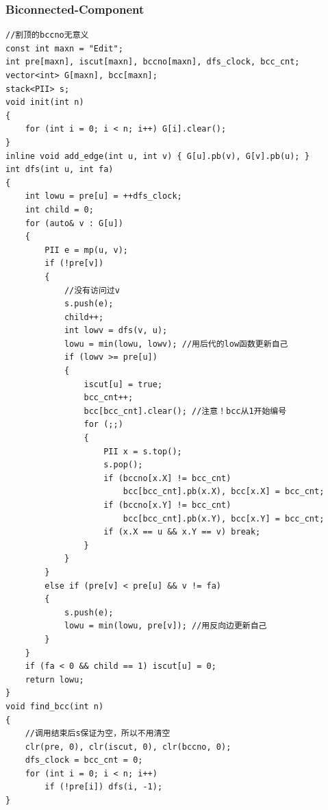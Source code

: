 \documentclass[twoside]{article}
\begin{document}
\subsubsection{Biconnected-Component}
\begin{lstlisting}
//割顶的bccno无意义
const int maxn = "Edit";
int pre[maxn], iscut[maxn], bccno[maxn], dfs_clock, bcc_cnt;
vector<int> G[maxn], bcc[maxn];
stack<PII> s;
void init(int n)
{
    for (int i = 0; i < n; i++) G[i].clear();
}
inline void add_edge(int u, int v) { G[u].pb(v), G[v].pb(u); }
int dfs(int u, int fa)
{
    int lowu = pre[u] = ++dfs_clock;
    int child = 0;
    for (auto& v : G[u])
    {
        PII e = mp(u, v);
        if (!pre[v])
        {
            //没有访问过v
            s.push(e);
            child++;
            int lowv = dfs(v, u);
            lowu = min(lowu, lowv); //用后代的low函数更新自己
            if (lowv >= pre[u])
            {
                iscut[u] = true;
                bcc_cnt++;
                bcc[bcc_cnt].clear(); //注意！bcc从1开始编号
                for (;;)
                {
                    PII x = s.top();
                    s.pop();
                    if (bccno[x.X] != bcc_cnt)
                        bcc[bcc_cnt].pb(x.X), bcc[x.X] = bcc_cnt;
                    if (bccno[x.Y] != bcc_cnt)
                        bcc[bcc_cnt].pb(x.Y), bcc[x.Y] = bcc_cnt;
                    if (x.X == u && x.Y == v) break;
                }
            }
        }
        else if (pre[v] < pre[u] && v != fa)
        {
            s.push(e);
            lowu = min(lowu, pre[v]); //用反向边更新自己
        }
    }
    if (fa < 0 && child == 1) iscut[u] = 0;
    return lowu;
}
void find_bcc(int n)
{
    //调用结束后s保证为空，所以不用清空
    clr(pre, 0), clr(iscut, 0), clr(bccno, 0);
    dfs_clock = bcc_cnt = 0;
    for (int i = 0; i < n; i++)
        if (!pre[i]) dfs(i, -1);
}
\end{lstlisting}
\end{document}
